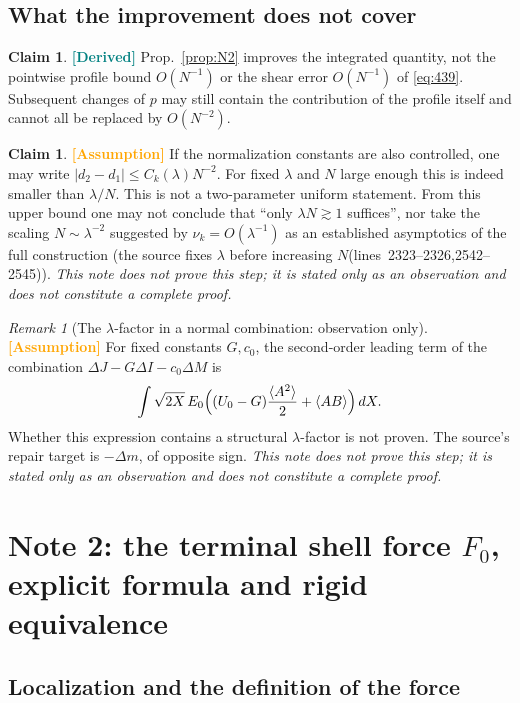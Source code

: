 \documentclass[11pt,a4paper]{article}
\theoremstyle{definition}
\newtheorem{claim}[theorem]{Claim}
\theoremstyle{remark}
\newtheorem{remark}[theorem]{Remark}
\newcommand{\lnos}[1]{(lines~#1)}
\newcommand{\DER}{\textcolor{teal}{\textbf{[Derived]}}}
\newcommand{\HYP}{\textcolor{orange}{\textbf{[Assumption]}}}
\newcommand{\notproved}{\emph{This note does not prove this step; it is stated only as an observation
and does not constitute a complete proof.}}
\begin{document}
\subsection{What the improvement does not cover}
\label{sec:note1-limit}

\begin{claim}
\label{cl:not-pointwise}
\DER
Prop.~\ref{prop:N2} improves the integrated quantity, not the pointwise profile bound $O(N^{-1})$
or the shear error $O(N^{-1})$ of \eqref{eq:439}. Subsequent changes of $p$ may still contain the
contribution of the profile itself and cannot all be replaced by $O(N^{-2})$.
\end{claim}

\begin{claim}
\label{cl:not-uniform}
\HYP
If the normalization constants are also controlled, one may write $|d_2-d_1|\le C_k(\lambda)N^{-2}$.
For fixed $\lambda$ and $N$ large enough this is indeed smaller than $\lambda/N$.
This is not a two-parameter uniform statement. From this upper bound one may not conclude that
``only $\lambda N\gtrsim 1$ suffices'', nor take the scaling $N\sim\lambda^{-2}$ suggested by
$\nu_k=O(\lambda^{-1})$ as an established asymptotics of the full construction
(the source fixes $\lambda$ before increasing $N$\lnos{2323--2326,2542--2545}).
\notproved
\end{claim}

\begin{remark}[The $\lambda$-factor in a normal combination: observation only]
\HYP
For fixed constants $G,c_0$, the second-order leading term of the combination
$\Delta J-G\Delta I-c_0\Delta M$ is
\[
\int\sqrt{2X}\,E_0\Bigl((U_0-G)\frac{\langle A^2\rangle}{2}+\langle AB\rangle\Bigr)\,dX.
\]
Whether this expression contains a structural $\lambda$-factor is not proven. The source's repair target
is $-\Delta m$, of opposite sign.
\notproved
\end{remark}

\section{Note 2: the terminal shell force \texorpdfstring{$F_0$}{F\_0}, explicit formula and rigid equivalence}
\label{sec:note2}

\subsection{Localization and the definition of the force}
\label{sec:note2-loc}
\end{document}
